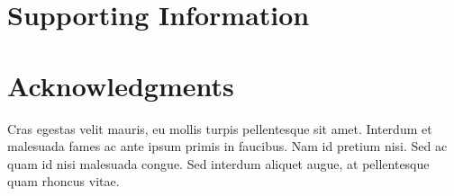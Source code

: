 \documentclass[10pt,letterpaper]{article}
\begin{document}
\clearpage
\section{Supporting Information}



\section*{Acknowledgments}

Cras egestas velit mauris, eu mollis turpis pellentesque sit
amet. Interdum et malesuada fames ac ante ipsum primis in
faucibus. Nam id pretium nisi. Sed ac quam id nisi malesuada
congue. Sed interdum aliquet augue, at pellentesque quam rhoncus
vitae.

\nolinenumbers


\end{document}
